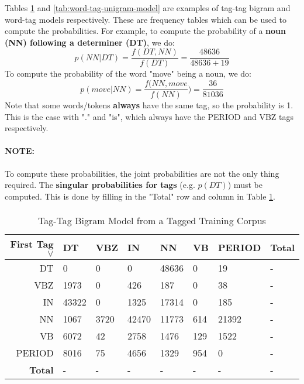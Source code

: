 \documentclass{article}
\begin{document}
Tables \ref{tab:tag-tag-bigram-model} and \ref{tab:word-tag-unigram-model} are examples of tag-tag bigram and word-tag models respectively. These are frequency tables which can be used to compute the probabilities. For example, to compute the probability of a \textbf{noun (NN) following a determiner (DT)}, we do:
\begin{equation}
p(NN|DT) = \frac{f(DT, NN)}{f(DT)} = \frac{48636}{48636 + 19}
\end{equation}
To compute the probability of the word "move" being a noun, we do:
\begin{equation}
p(move|NN) = \frac{f(NN,move}{f(NN)}) = \frac{36}{81036}
\end{equation}
Note that some words/tokens \textbf{always} have the same tag, so the probability is 1. This is the case with "." and "is", which always have the PERIOD and VBZ tags respectively.

\paragraph{\textbf{NOTE: }} To compute these probabilities, the joint probabilities are not the only thing required. The \textbf{singular probabilities for tags} (e.g. $p(DT)$) must be computed. This is done by filling in the "Total" row and column in Table \ref{tab:tag-tag-bigram-model}.
\paragraph{}

\begin{table}
	\centering
	\begin{tabular}{r|lllllll}
		\textbf{First Tag $\lor$} & DT & VBZ & IN & NN & VB & PERIOD & \textbf{Total} \\
		\hline
		DT & 0 & 0 & 0 & 48636 & 0 & 19 & - \\
		VBZ & 1973 & 0 & 426 & 187 & 0 & 38 & - \\
		IN & 43322 & 0 & 1325 & 17314 & 0 & 185 & - \\
		NN & 1067 & 3720 & 42470 & 11773 & 614 & 21392 & - \\
		VB & 6072 & 42 & 2758 & 1476 & 129 & 1522 & - \\
		PERIOD & 8016 & 75 & 4656 & 1329 & 954 & 0 & - \\
		\textbf{Total} & - & - & - & - & - & - & - \\
	\end{tabular}
	\caption{Tag-Tag Bigram Model from a Tagged Training Corpus}
	\label{tab:tag-tag-bigram-model}
\end{table}
\end{document}
